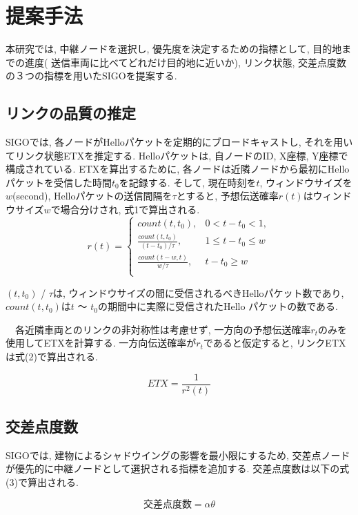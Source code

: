 \documentclass[technicalreport]{ieicej}
\begin{document}
\section{提案手法}
本研究では, 中継ノードを選択し, 優先度を決定するための指標として, 目的地までの進度( 送信車両に比べてどれだけ目的地に近いか), リンク状態, 交差点度数の３つの指標を用いたSIGOを提案する. 
\subsection{リンクの品質の推定}
SIGOでは, 各ノードがHelloパケットを定期的にブロードキャストし, それを用いてリンク状態ETXを推定する. Helloパケットは, 自ノードのID, X座標, Y座標で構成されている. ETXを算出するために, 各ノードは近隣ノードから最初にHelloパケットを受信した時間$t_{0}$を記録する. そして, 現在時刻を$t$, ウィンドウサイズを$w$(second), Helloパケットの送信間隔を$τ$とすると, 予想伝送確率$r(t)$はウィンドウサイズ$w$で場合分けされ, 式1で算出される.
\begin{equation}
r(t) =\begin{cases}count(t, t_{0}), & 0 < t - t_{0} < 1,  \\ \frac{count(t,t_{0})}{(t-t_{0}) / τ}, & 1 \leq t - t_{0} \leq w\\
\frac{count(t - w,t)}{w / τ}, &  t - t_{0} \geq w\\
\end{cases}
\end{equation}

$(t,t_{0})$ / $τ$は, ウィンドウサイズの間に受信されるべきHelloパケット数であり, $count(t,t_{0})$は$t$ ～ $t_{0}$の期間中に実際に受信されたHello パケットの数である. \par
　各近隣車両とのリンクの非対称性は考慮せず, 一方向の予想伝送確率$r_{t}$のみを使用してETXを計算する. 一方向伝送確率が$r_{t}$であると仮定すると, リンクETXは式(2)で算出される.
 
 \begin{equation}
 ETX = \frac{1}{r^{2}(t)} 
 \end{equation}

\subsection{交差点度数}
SIGOでは, 建物によるシャドウイングの影響を最小限にするため, 交差点ノードが優先的に中継ノードとして選択される指標を追加する. 交差点度数は以下の式(3)で算出される.

\begin{equation}
 交差点度数 = αθ
 \end{equation}
 
\end{document}
